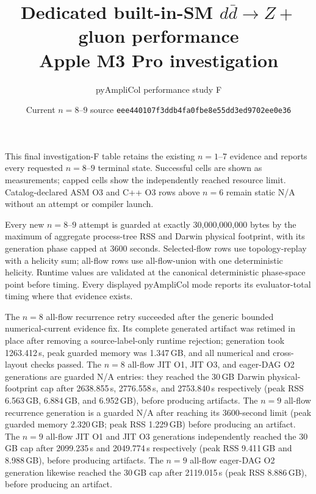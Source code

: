 \documentclass[10pt,letterpaper]{article}
\title{\vspace{-1.2cm}\textbf{Dedicated built-in-SM \(d\bar d\to Z+\) gluon performance}\\
  \large Apple M3 Pro investigation}
\author{pyAmpliCol performance study F}
\date{Current \(n=8\)--\(9\) source
  \texttt{eee440107f3ddb4fa0fbe8e55dd3ed9702ee0e36}}
\newcommand{\ReportTableNote}[1]{\par\smallskip\noindent\footnotesize\textcolor{ReportMuted}{#1}\par}
\begin{document}
\maketitle
\small
This final investigation-F table retains the existing \(n=1\)--\(7\) evidence
and reports every requested \(n=8\)--\(9\) terminal state. Successful cells
are shown as measurements; capped cells show the independently reached
resource limit. Catalog-declared ASM O3 and C++ O3 rows above \(n=6\) remain
static N/A without an attempt or compiler launch.

Every new \(n=8\)--\(9\) attempt is guarded at exactly 30,000,000,000 bytes by
the maximum of aggregate process-tree RSS and Darwin physical footprint, with
its generation phase capped at 3600 seconds. Selected-flow rows use
topology-replay with a helicity sum; all-flow rows use all-flow-union with one
deterministic helicity. Runtime values are validated at the canonical
deterministic phase-space point before timing. Every displayed pyAmpliCol mode
reports its evaluator-total timing where that evidence exists.

\begin{landscape}
\setcounter{section}{6}
\setcounter{subsection}{0}

\ReportTableNote{The \(n=8\) all-flow recurrence retry succeeded after the
generic bounded numerical-current evidence fix. Its complete generated
artifact was retimed in place after removing a source-label-only runtime
rejection; generation took 1263.412\,s, peak guarded memory was 1.347\,GB,
and all numerical and cross-layout checks passed. The \(n=8\) all-flow JIT O1,
JIT O3, and eager-DAG O2 generations are guarded N/A entries: they reached the
30\,GB Darwin physical-footprint cap after 2638.855\,s, 2776.558\,s, and
2753.840\,s respectively (peak RSS 6.563\,GB, 6.884\,GB, and 6.952\,GB),
before producing artifacts. The \(n=9\) all-flow recurrence generation is a
guarded N/A after reaching its 3600-second limit (peak guarded memory
2.320\,GB; peak RSS 1.229\,GB) before producing an artifact. The \(n=9\)
all-flow JIT O1 and JIT O3 generations independently reached the 30\,GB cap
after 2099.235\,s and 2049.774\,s respectively (peak RSS 9.411\,GB and
8.988\,GB), before producing artifacts. The \(n=9\) all-flow eager-DAG O2
generation likewise reached the 30\,GB cap after 2119.015\,s (peak RSS
8.886\,GB), before producing an artifact.}
\end{landscape}
\end{document}
